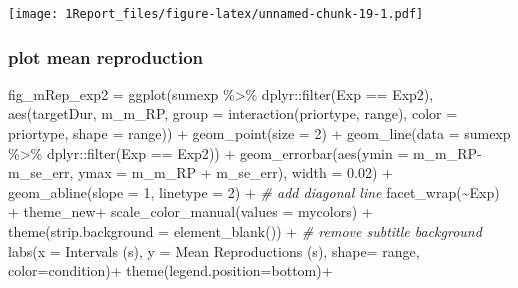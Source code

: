 \documentclass[
]{article}
\newenvironment{Shaded}{\begin{snugshade}}{\end{snugshade}}
\newcommand{\AttributeTok}[1]{\textcolor[rgb]{0.77,0.63,0.00}{#1}}
\newcommand{\CommentTok}[1]{\textcolor[rgb]{0.56,0.35,0.01}{\textit{#1}}}
\newcommand{\DecValTok}[1]{\textcolor[rgb]{0.00,0.00,0.81}{#1}}
\newcommand{\FloatTok}[1]{\textcolor[rgb]{0.00,0.00,0.81}{#1}}
\newcommand{\FunctionTok}[1]{\textcolor[rgb]{0.00,0.00,0.00}{#1}}
\newcommand{\NormalTok}[1]{#1}
\newcommand{\OtherTok}[1]{\textcolor[rgb]{0.56,0.35,0.01}{#1}}
\newcommand{\SpecialCharTok}[1]{\textcolor[rgb]{0.00,0.00,0.00}{#1}}
\newcommand{\StringTok}[1]{\textcolor[rgb]{0.31,0.60,0.02}{#1}}
\begin{document}
\texttt{[image: 1Report\_files/figure-latex/unnamed-chunk-19-1.pdf]}

\hypertarget{plot-mean-reproduction}{%
\subsubsection{plot mean reproduction}\label{plot-mean-reproduction}}

\begin{Shaded}
\begin{Highlighting}[]
\NormalTok{fig\_mRep\_exp2 }\OtherTok{=} \FunctionTok{ggplot}\NormalTok{(sumexp }\SpecialCharTok{\%\textgreater{}\%}\NormalTok{  dplyr}\SpecialCharTok{::}\FunctionTok{filter}\NormalTok{(Exp }\SpecialCharTok{==} \StringTok{\textquotesingle{}Exp2\textquotesingle{}}\NormalTok{),}
                       \FunctionTok{aes}\NormalTok{(targetDur, m\_m\_RP, }\AttributeTok{group =} \FunctionTok{interaction}\NormalTok{(priortype, range), }\AttributeTok{color =}\NormalTok{ priortype, }\AttributeTok{shape =}\NormalTok{ range)) }\SpecialCharTok{+} 
  \FunctionTok{geom\_point}\NormalTok{(}\AttributeTok{size =} \DecValTok{2}\NormalTok{) }\SpecialCharTok{+} 
  \FunctionTok{geom\_line}\NormalTok{(}\AttributeTok{data =}\NormalTok{ sumexp }\SpecialCharTok{\%\textgreater{}\%}\NormalTok{  dplyr}\SpecialCharTok{::}\FunctionTok{filter}\NormalTok{(Exp }\SpecialCharTok{==} \StringTok{\textquotesingle{}Exp2\textquotesingle{}}\NormalTok{)) }\SpecialCharTok{+} 
  \FunctionTok{geom\_errorbar}\NormalTok{(}\FunctionTok{aes}\NormalTok{(}\AttributeTok{ymin =}\NormalTok{ m\_m\_RP}\SpecialCharTok{{-}}\NormalTok{m\_se\_err, }\AttributeTok{ymax =}\NormalTok{ m\_m\_RP }\SpecialCharTok{+}\NormalTok{ m\_se\_err), }\AttributeTok{width =} \FloatTok{0.02}\NormalTok{) }\SpecialCharTok{+} 
  \FunctionTok{geom\_abline}\NormalTok{(}\AttributeTok{slope =} \DecValTok{1}\NormalTok{, }\AttributeTok{linetype =} \DecValTok{2}\NormalTok{) }\SpecialCharTok{+} \CommentTok{\# add diagonal line}
  \FunctionTok{facet\_wrap}\NormalTok{(}\SpecialCharTok{\textasciitilde{}}\NormalTok{Exp) }\SpecialCharTok{+}
\NormalTok{  theme\_new}\SpecialCharTok{+} \FunctionTok{scale\_color\_manual}\NormalTok{(}\AttributeTok{values =}\NormalTok{ mycolors) }\SpecialCharTok{+}
  \FunctionTok{theme}\NormalTok{(}\AttributeTok{strip.background =} \FunctionTok{element\_blank}\NormalTok{()) }\SpecialCharTok{+} \CommentTok{\# remove subtitle background}
  \FunctionTok{labs}\NormalTok{(}\AttributeTok{x =} \StringTok{\textquotesingle{}Intervals (s)\textquotesingle{}}\NormalTok{, }\AttributeTok{y =} \StringTok{\textquotesingle{}Mean Reproductions (s)\textquotesingle{}}\NormalTok{, }\AttributeTok{shape=} \StringTok{\textquotesingle{}range\textquotesingle{}}\NormalTok{, }\AttributeTok{color=}\StringTok{\textquotesingle{}condition\textquotesingle{}}\NormalTok{)}\SpecialCharTok{+} \FunctionTok{theme}\NormalTok{(}\AttributeTok{legend.position=}\StringTok{\textquotesingle{}bottom\textquotesingle{}}\NormalTok{)}\SpecialCharTok{+}

\end{Highlighting}
\end{Shaded}
\end{document}
